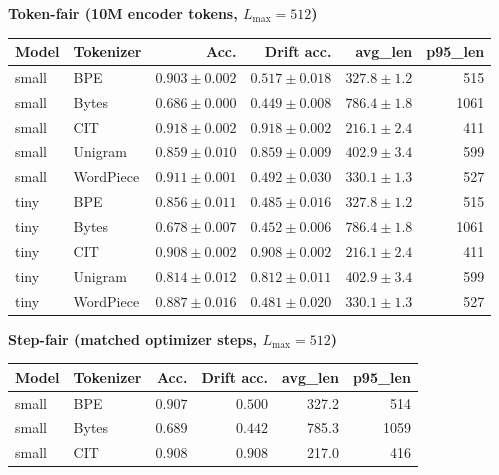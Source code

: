 \begin{table}[t]
\centering
\small
\setlength{\tabcolsep}{5.0pt}
\renewcommand{\arraystretch}{1.05}
\begin{minipage}[t]{0.485\textwidth}
\centering
\textbf{Token-fair (10M encoder tokens, $L_{\max}{=}512$)}\\[-0.35em]
\begin{tabular}{llrrrr}
\toprule
Model & Tokenizer & Acc. & Drift acc. & avg\_len & p95\_len \\
\midrule
small & BPE & $0.903 \pm 0.002$ & $0.517 \pm 0.018$ & $327.8 \pm 1.2$ & 515 \\
small & Bytes & $0.686 \pm 0.000$ & $0.449 \pm 0.008$ & $786.4 \pm 1.8$ & 1061 \\
small & CIT & $0.918 \pm 0.002$ & $0.918 \pm 0.002$ & $216.1 \pm 2.4$ & 411 \\
small & Unigram & $0.859 \pm 0.010$ & $0.859 \pm 0.009$ & $402.9 \pm 3.4$ & 599 \\
small & WordPiece & $0.911 \pm 0.001$ & $0.492 \pm 0.030$ & $330.1 \pm 1.3$ & 527 \\
tiny & BPE & $0.856 \pm 0.011$ & $0.485 \pm 0.016$ & $327.8 \pm 1.2$ & 515 \\
tiny & Bytes & $0.678 \pm 0.007$ & $0.452 \pm 0.006$ & $786.4 \pm 1.8$ & 1061 \\
tiny & CIT & $0.908 \pm 0.002$ & $0.908 \pm 0.002$ & $216.1 \pm 2.4$ & 411 \\
tiny & Unigram & $0.814 \pm 0.012$ & $0.812 \pm 0.011$ & $402.9 \pm 3.4$ & 599 \\
tiny & WordPiece & $0.887 \pm 0.016$ & $0.481 \pm 0.020$ & $330.1 \pm 1.3$ & 527 \\
\bottomrule
\end{tabular}
\end{minipage}\hfill
\begin{minipage}[t]{0.485\textwidth}
\centering
\textbf{Step-fair (matched optimizer steps, $L_{\max}{=}512$)}\\[-0.35em]
\begin{tabular}{llrrrr}
\toprule
Model & Tokenizer & Acc. & Drift acc. & avg\_len & p95\_len \\
\midrule
small & BPE & $0.907$ & $0.500$ & 327.2 & 514 \\
small & Bytes & $0.689$ & $0.442$ & 785.3 & 1059 \\
small & CIT & $0.908$ & $0.908$ & 217.0 & 416 \\

\end{tabular}
\end{minipage}
\end{table}
